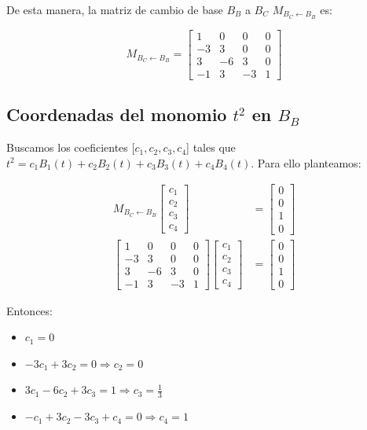 \documentclass{article}
\begin{document}
De esta manera, la matriz de cambio de base $B_B$ a $B_C$ $M_{B_C \leftarrow B_B}$ es:

$$
M_{B_C \leftarrow B_B} = 
\begin{bmatrix}
1 & 0 & 0 & 0 \\
-3 & 3 & 0 & 0  \\
3 & -6 & 3 & 0 \\
-1 & 3 & -3 &  1
\end{bmatrix}
$$

\subsection*{Coordenadas del monomio $t^2$ en $B_B$}

Buscamos los coeficientes [$c_1, c_2, c_3, c_4$] tales que $t^2 = c_1B_1(t) + c_2B_2(t) + c_3B_3(t) + c_4B_4(t)$. Para ello planteamos:

$$
\begin{aligned}
M_{B_C \leftarrow B_B}
\begin{bmatrix}
c_1  \\
c_2  \\
c_3 \\
c_4
\end{bmatrix}&=
\begin{bmatrix}
0  \\
0  \\
1 \\
0
\end{bmatrix} \\
\begin{bmatrix}
1 & 0 & 0 & 0 \\
-3 & 3 & 0 & 0  \\
3 & -6 & 3 & 0 \\
-1 & 3 & -3 &  1
\end{bmatrix}
\begin{bmatrix}
c_1  \\
c_2  \\
c_3 \\
c_4
\end{bmatrix}&=
\begin{bmatrix}
0  \\
0  \\
1 \\
0
\end{bmatrix}
\end{aligned}
$$

Entonces:

\begin{itemize}
    \item $c_1 = 0$
    \item $-3c_1 + 3c_2 = 0 \Rightarrow c_2 = 0$
    \item $3c_1 - 6c_2 + 3c_3 = 1 \Rightarrow c_3 = \frac{1}{3}$
    \item $-c_1 + 3c_2 - 3c_3 + c_4 = 0 \Rightarrow c_4 = 1$
\end{itemize}
\end{document}
